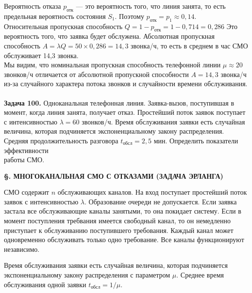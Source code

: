 \documentclass{article}
\begin{document}
Вероятность отказа $p_{\text{отк}
}$ — это вероятность того, что линия занята, то есть предельная вероятность состояния $S_1$. Поэтому $p_{\text{отк}} = p_1 \approx 0,14.$ \\ \indent 
Относительная пропускная способность $Q = 1 - p_{\text{отк}} = 1 - 0,714 = 0,286$ Это вероятность того, что заявка будет обслужена. Абсолютная  пропускная  способность $A = \lambda Q = 50\times0,286 = 14,3$ звонка/ч, то есть в среднем в час СМО обслуживает 14,3 звонка. \\ \indent Мы видим,  что номинальная  пропускная способность телефонной линии $\mu \approx 20$ звонков/ч отличается от абсолютной пропускной способности $A  =  14,3$  звонка/ч  из-за  случайного  характера  потока звонков и случайности времени обслуживания. \\ \\
\indent \; \; \; \textbf{Задача  100.} Одноканальная телефонная линия. Заявка-вызов, поступившая в момент, когда линия занята, получает отказ. Простейший  поток  заявок  поступает  с  интенсивностью $\lambda = 60 $ звонков/ч. Время обслуживания заявки есть случайная величина, которая под­чиняется  экспоненциальному  закону  распределения.  Средняя  продолжительность разговора $t_{\text{обсл}} = 2,5$ мин. Определить показатели эффективности \\работы СМО.

\begin{center}
\textbf{\S {}.  МНОГОКАНАЛЬНАЯ  СМО С ОТКАЗАМИ (ЗАДАЧА ЭРЛАНГА)}
\end{center}



\indent СМО содержит $n$ обслуживающих каналов. На вход поступает простейший поток заявок с интенсивностью $\lambda$. Образование очереди не допускается. Если заявка застала все обслуживающие каналы занятыми, то она покидает систему. Если в момент поступления требвания имеется свободный канал, то он немедленно приступает к обслуживанию поступившего требования. Каждый канал может одновременно обслуживать только одно требование. Все каналы функционируют независимо.

\indent Время обслуживания заявки есть случайная величина, которая подчиняется экспоненциальному закону распределения с параметром $\mu$. Среднее время обслуживания одной заявки $t_{\text{обсл}} = 1/\mu$.
\end{document}
